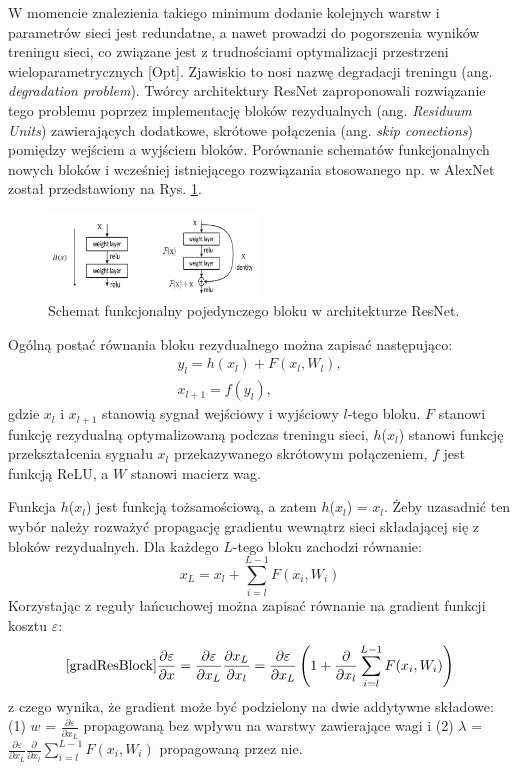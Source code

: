 W momencie znalezienia takiego minimum dodanie kolejnych warstw i parametrów sieci jest redundatne, a nawet prowadzi do pogorszenia wyników treningu sieci, co związane jest z trudnościami optymalizacji przestrzeni wieloparametrycznych [Opt]. Zjawiskio to nosi nazwę degradacji treningu (ang. \textit{degradation problem}). Twórcy architektury ResNet zaproponowali rozwiązanie tego problemu poprzez implementację bloków rezydualnych (ang. \textit{Residuum Units}) zawierających dodatkowe, skrótowe połączenia (ang. \textit{skip conections}) pomiędzy wejściem a wyjściem bloków. Porównanie schematów funkcjonalnych nowych bloków i wcześniej istniejącego rozwiązania stosowanego np. w AlexNet został przedstawiony na Rys. \ref{ResNetBlock}.
\begin{figure}[h!]
	\centering
	\includegraphics[width=0.5\textwidth]{figures/ResidualBlock.jpg}
	\caption{Schemat funkcjonalny pojedynczego bloku w architekturze ResNet.}
	\label{ResNetBlock}
\end{figure} 

Ogólną postać równania bloku rezydualnego można zapisać następująco:
\begin{equation}
\begin{split}
y_l = h(x_l) + F(x_l, W_l),\\
x_{l+1} = f(y_l),
\end{split}
\end{equation}
gdzie $x_l$ i $x_{l+1}$ stanowią sygnał wejściowy i wyjściowy $l$-tego bloku. $F$ stanowi funkcję rezydualną optymalizowaną podczas treningu sieci, $h$($x_l$) stanowi funkcję przekształcenia sygnału $x_l$ przekazywanego skrótowym połączeniem, $f$ jest funkcją ReLU, a $W$ stanowi macierz wag.

Funkcja $h$($x_l$) jest funkcją tożsamościową, a zatem $h$($x_l$) = $x_l$. Żeby uzasadnić ten wybór należy rozważyć propagację gradientu wewnątrz sieci składającej się z bloków rezydualnych. Dla każdego $L$-tego bloku zachodzi równanie:
\begin{equation}
x_L = x_l + \sum_{i=l}^{L-1}F(x_i, W_i)
\end{equation}
Korzystając z reguły łańcuchowej można zapisać równanie na gradient funkcji kosztu $\varepsilon$:
\begin{equation}
\ref{gradResBlock}
\frac{\partial \varepsilon}{\partial x} =  \frac{\partial \varepsilon}{\partial x_L} \frac{\partial x_L}{\partial x_l} =  \frac{\partial \varepsilon}{\partial x_L}\left (1 +   \frac{\partial }{\partial x_l}\sum_{i=l}^{L-1}F(x_i, W_i) \right )
\end{equation}
z czego wynika, że gradient może być podzielony na dwie addytywne składowe: (1) $w$ = $\frac{\partial \varepsilon}{\partial x_L}$ propagowaną bez wpływu na warstwy zawierające wagi i (2) $\lambda$ = $\frac{\partial \varepsilon}{\partial x_L}\frac{\partial }{\partial x_l}\sum_{i=l}^{L-1}F(x_i, W_i)$ propagowaną przez nie.

